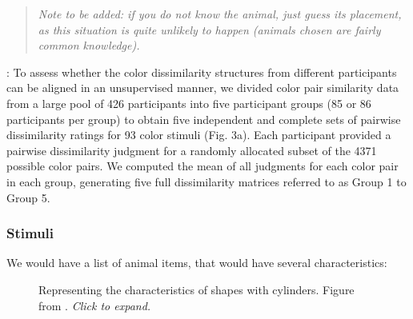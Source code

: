 \documentclass[
  authoryear]{elsarticle}
\begin{document}
\begin{quote}
\emph{Note to be added: if you do not know the animal, just guess its
placement, as this situation is quite unlikely to happen (animals chosen
are fairly common knowledge).}
\end{quote}

\citet{kawakita2023}: To assess whether the color dissimilarity
structures from different participants can be aligned in an unsupervised
manner, we divided color pair similarity data from a large pool of 426
participants into five participant groups (85 or 86 participants per
group) to obtain five independent and complete sets of pairwise
dissimilarity ratings for 93 color stimuli (Fig. 3a). Each participant
provided a pairwise dissimilarity judgment for a randomly allocated
subset of the 4371 possible color pairs. We computed the mean of all
judgments for each color pair in each group, generating five full
dissimilarity matrices referred to as Group 1 to Group 5.

\subsubsection{Stimuli}\label{stimuli}

We would have a list of animal items, that would have several
characteristics:

\begin{figure}


\caption{\label{fig-marr}Representing the characteristics of shapes with
cylinders. Figure from \citet{marr1997}. \emph{Click to expand.}}

\end{figure}%
\end{document}
